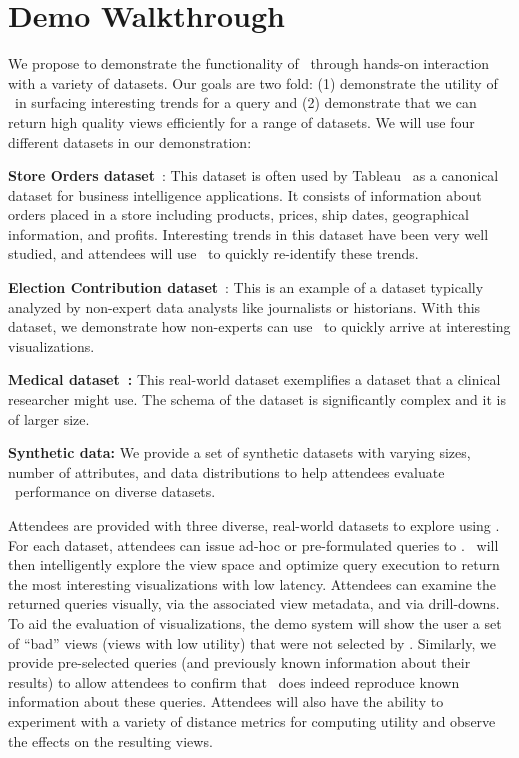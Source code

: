 \section{Demo Walkthrough}
\label{sec:demo-walkthrough}
 
We propose to demonstrate the functionality of \SeeDB\ through hands-on
interaction with a variety of datasets. Our goals are two fold: (1) demonstrate
the utility of \SeeDB\ in surfacing interesting trends for a query
and (2) demonstrate that we can return high quality views efficiently for
a range of datasets. We will use four different datasets in our demonstration:

\begin{denselist}
  \item {\bf Store Orders dataset}~\cite{superstore}: This dataset is
    often used by Tableau~\cite{tableau} as a canonical dataset for
    business intelligence applications. It consists of information
    about orders placed in a store including products, prices, ship
    dates, geographical information, and profits. Interesting trends in
    this dataset have been very well studied, and attendees will use
    \SeeDB\ to quickly re-identify these trends. 
  \item {\bf Election Contribution dataset}~\cite{election_data}: This
  is an example of a dataset typically analyzed by
    non-expert data analysts like journalists or historians. With this
    dataset, we demonstrate how non-experts can use \SeeDB\ to quickly
    arrive at interesting visualizations.
  \item {\bf Medical dataset~\cite{mimic}:} This real-world dataset exemplifies
  a dataset that a clinical researcher might use. The schema of the dataset is
  significantly complex and it is of larger size.  
    \item {\bf Synthetic data:} We provide a set of synthetic datasets with
    varying sizes, number of attributes, and data distributions to help
    attendees evaluate \SeeDB\ performance on diverse datasets.
\end{denselist}

 Attendees are provided with three
diverse, real-world datasets to explore using \SeeDB. For each dataset,
attendees can issue ad-hoc or pre-formulated queries to \SeeDB. \SeeDB\ will
then intelligently explore the view space and optimize query execution to return the
most interesting visualizations with low latency. Attendees can examine the
returned queries visually, via the associated view metadata, and via
drill-downs. To aid the evaluation of visualizations, the demo system will show
the user a set of ``bad'' views (views with low utility) that were not selected
by \SeeDB.
Similarly, we provide pre-selected queries (and
previously known information about their results) to allow attendees to
confirm that \SeeDB\ does indeed reproduce known information about these
queries. Attendees will also have the ability to experiment with a
variety of distance metrics for computing utility and observe the effects on the
resulting views.


